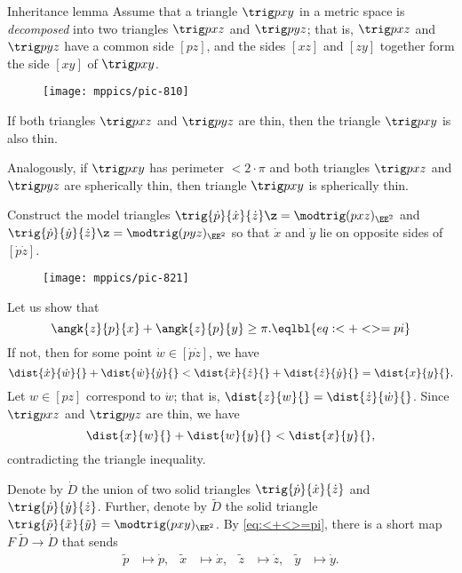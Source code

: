 \begin{thm}{Inheritance lemma}
\label{lem:inherit-angle} 
Assume that a triangle $\trig p x y$ 
in a metric space is \emph{decomposed} 
into two triangles $\trig p x z$ and $\trig p y z$;
that is, $\trig p x z$ and $\trig p y z$ have a common side $[p z]$, and the sides $[x z]$ and $[z y]$ together form the side $[x y]$ of $\trig p x y$.

\begin{wrapfigure}{r}{25mm}
\vskip-4mm
\centering
\texttt{[image: mppics/pic-810]}
\end{wrapfigure}

If both triangles $\trig p x z$ and $\trig p y z$ are thin, 
then the triangle $\trig p x y$ is also thin.

Analogously, if $\trig p x y$ has perimeter $<2\cdot\pi$ and both triangles $\trig p x z$ and $\trig p y z$ are spherically thin, then triangle $\trig p x y$ is spherically thin.
\end{thm} 


Construct  the model triangles $\trig{\dot p}{\dot x}{\dot z}\z=\modtrig(p x z)_{\EE^2}$ 
and $\trig {\dot p} {\dot y} {\dot z}\z=\modtrig(p y z)_{\EE^2}$ so that $\dot x$ and $\dot y$ lie on opposite sides of $[\dot p\dot z]$.

\begin{wrapfigure}{r}{33mm}
\vskip-0mm
\centering
\texttt{[image: mppics/pic-821]}
\vskip0mm
\end{wrapfigure}

Let us show that 
\[\angk{z}{p}{x}+\angk{z}{p}{y}
\ge
\pi.
\eqlbl{eq:<+<>=pi}\]
If not, then for some point $\dot w\in[\dot p\dot z]$, we have \[\dist{\dot x}{\dot w}{}+\dist{\dot w}{\dot y}{}
<
\dist{\dot x}{\dot z}{}+\dist{\dot z}{\dot y}{}=\dist{x}{y}{}.\]
Let $w\in[p z]$ correspond to $\dot w$; that is, $\dist{z}{w}{}=\dist{\dot z}{\dot w}{}$. 
Since $\trig p x z$ and $\trig p y z$ are thin, we have 
\[\dist{x}{w}{}+\dist{w}{y}{}<\dist{x}{y}{},\]
contradicting the triangle inequality. 

Denote by $\dot D$ the union of two solid triangles $\trig {\dot p}{\dot x}{\dot z}$ and $\trig {\dot p} {\dot y} {\dot z}$.
Further, denote by $\tilde D$ the solid triangle $\trig{\tilde  p}{\tilde  x}{\tilde  y}=\modtrig(p x y)_{\EE^2}$.
By \ref{eq:<+<>=pi}, there is a short map $F\:\tilde D\to \dot D$ that sends 
\begin{align*}
\tilde p&\mapsto \dot p,
&
\tilde x&\mapsto \dot x,
&
\tilde z&\mapsto \dot z,
&
\tilde y&\mapsto \dot y.
\end{align*}


